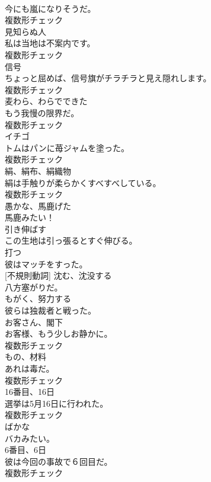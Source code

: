 \documentclass[8pt]{extreport}
\begin{document}
\begin{CJK}{UTF8}{min}
\\	今にも嵐になりそうだ。	
\\	複数形チェック
\\	[名詞]	見知らぬ人	
\\	私は当地は不案内です。	
\\	複数形チェック
\\	[名詞]	信号	
\\	ちょっと屈めば、信号旗がチラチラと見え隠れします。	
\\	複数形チェック
\\	[名詞]	⻨わら、わらでできた	
\\	もう我慢の限界だ。	
\\	複数形チェック
\\	[名詞]	イチゴ	
\\	トムはパンに苺ジャムを塗った。	
\\	複数形チェック
\\	[名詞]	絹、絹布、絹織物	
\\	絹は手触りが柔らかくすべすべしている。	
\\	複数形チェック
\\	[形容詞]	愚かな、馬鹿げた	
\\	馬鹿みたい！	
\\	[動詞]	引き伸ばす	
\\	この生地は引っ張るとすぐ伸びる。	
\\	[動詞]	打つ	
\\	彼はマッチをすった。	
\\	[動詞] [不規則動詞]	沈む、沈没する	
\\	八方塞がりだ。	
\\	[動詞]	もがく、努力する	
\\	彼らは独裁者と戦った。	
\\	[名詞]	お客さん、閣下	
\\	お客様、もう少しお静かに。	
\\	複数形チェック
\\	[名詞]	もの、材料	
\\	あれは毒だ。	
\\	複数形チェック
\\	[名詞]	16番目、16日	
\\	選挙は5月16日に行われた。	
\\	複数形チェック
\\	[形容詞]	ばかな	
\\	バカみたい。	
\\	[名詞]	6番目、6日	
\\	彼は今回の事故で６回目だ。	
\\	複数形チェック

\end{CJK}
\end{document}
